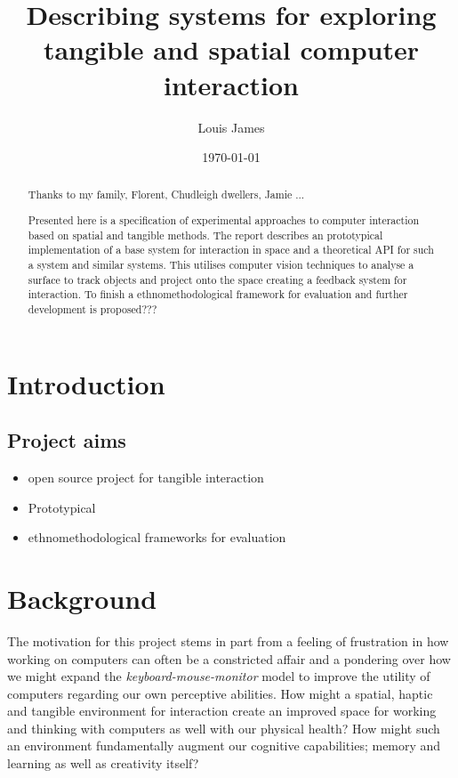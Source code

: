 \documentclass[12pt]{report}
\author{Louis James}
\date{\today}
\title{Describing systems for exploring tangible and spatial computer interaction}
\begin{document}
\maketitle

\renewcommand{\abstractname}{Acknowledgements}
\begin{abstract}
 Thanks to my family, Florent, Chudleigh dwellers, Jamie ...
\end{abstract}
\newpage


\renewcommand{\abstractname}{Abstract}
\begin{abstract}
Presented here is a specification of experimental approaches to computer
interaction based on spatial and tangible methods. The report describes an
prototypical implementation of a base system for interaction in space and a
theoretical API for such a system and similar systems. This utilises computer
vision techniques to analyse a surface to track objects and project onto the
space creating a feedback system for interaction. To finish a
ethnomethodological framework for evaluation and further development is
proposed???


\end{abstract}
\tableofcontents
\listoffigures
\chapter{Introduction}
\label{sec:org0965954}

\section{Project aims}
\label{sec:orgf1598c6}

\begin{itemize}
\item open source project for tangible interaction
\item Prototypical
\item ethnomethodological frameworks for evaluation
\end{itemize}

\chapter{Background}
\label{sec:orgc0202dc}

The motivation for this project stems in part from a feeling of frustration in
 how working on computers can often be a constricted affair and a pondering over
 how we might expand the \emph{keyboard-mouse-monitor} model to improve the utility
 of computers regarding our own perceptive abilities. How might a spatial,
 haptic and tangible environment for interaction create an improved space for
 working and thinking with computers as well with our physical health? How might
 such an environment fundamentally augment our cognitive capabilities; memory
 and learning as well as creativity itself?
\end{document}
